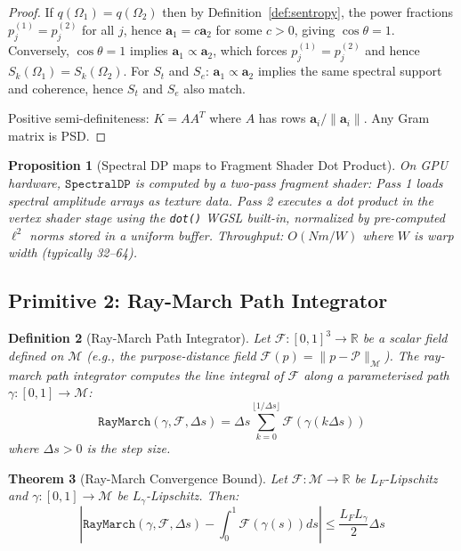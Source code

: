 \documentclass[10pt,twocolumn]{article}
\newtheorem{theorem}{Theorem}[section]
\newtheorem{proposition}[theorem]{Proposition}
\newtheorem{definition}[theorem]{Definition}
\newcommand{\R}{\mathbb{R}}
\newcommand{\PurposePoint}{\mathcal{P}}
\newcommand{\ManifoldM}{\mathcal{M}}
\begin{document}
\begin{proof}
If $q(\Omega_1) = q(\Omega_2)$ then by Definition~\ref{def:sentropy},
the power fractions $p_j^{(1)} = p_j^{(2)}$ for all $j$,
hence $\mathbf{a}_1 = c \mathbf{a}_2$ for some $c > 0$,
giving $\cos\theta = 1$.
Conversely, $\cos\theta = 1$ implies $\mathbf{a}_1 \propto \mathbf{a}_2$,
which forces $p_j^{(1)} = p_j^{(2)}$ and hence $S_k(\Omega_1) = S_k(\Omega_2)$.
For $S_t$ and $S_e$: $\mathbf{a}_1 \propto \mathbf{a}_2$ implies
the same spectral support and coherence, hence $S_t$ and $S_e$ also match.

Positive semi-definiteness: $K = AA^T$ where $A$ has rows $\mathbf{a}_i / \|\mathbf{a}_i\|$.
Any Gram matrix is PSD.
\end{proof}

\begin{proposition}[Spectral DP maps to Fragment Shader Dot Product]
\label{prop:dp-shader}
On GPU hardware, $\mathtt{SpectralDP}$ is computed by a two-pass fragment shader:
Pass 1 loads spectral amplitude arrays as texture data.
Pass 2 executes a dot product in the vertex shader stage using the
\texttt{dot()} WGSL built-in, normalized by pre-computed $\ell^2$ norms
stored in a uniform buffer.
Throughput: $O(Nm/W)$ where $W$ is warp width (typically 32--64).
\end{proposition}

\subsection{Primitive 2: Ray-March Path Integrator}

\begin{definition}[Ray-March Path Integrator]
\label{def:raymarch}
Let $\mathcal{F} : [0,1]^3 \to \R$ be a scalar field defined on $\ManifoldM$
(e.g., the purpose-distance field $\mathcal{F}(p) = \|p - \PurposePoint\|_\ManifoldM$).
The \emph{ray-march path integrator} computes the line integral of $\mathcal{F}$
along a parameterised path $\gamma : [0,1] \to \ManifoldM$:
\begin{equation}
\mathtt{RayMarch}(\gamma, \mathcal{F}, \Delta s) = \Delta s \sum_{k=0}^{\lfloor 1/\Delta s \rfloor}
\mathcal{F}(\gamma(k \Delta s))
\label{eq:raymarch}
\end{equation}
where $\Delta s > 0$ is the step size.
\end{definition}

\begin{theorem}[Ray-March Convergence Bound]
\label{thm:raymarch-bound}
Let $\mathcal{F} : \ManifoldM \to \R$ be $L_F$-Lipschitz and
$\gamma : [0,1] \to \ManifoldM$ be $L_\gamma$-Lipschitz.
Then:
\begin{equation}
\left| \mathtt{RayMarch}(\gamma, \mathcal{F}, \Delta s) - \int_0^1 \mathcal{F}(\gamma(s)) ds \right|
\leq \frac{L_F L_\gamma}{2} \Delta s
\label{eq:raymarch-error}
\end{equation}
\end{theorem}
\end{document}
